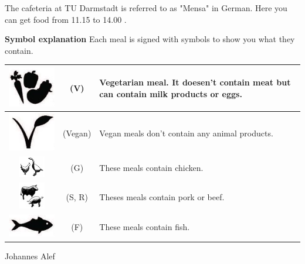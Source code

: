 {The cafeteria at TU Darmstadt is referred to as "Mensa" in German.
Here you can get food from 11.15 to 14.00 .
}{


\noindent\textbf{Symbol explanation}
Each meal is signed with symbols to show you what they contain.

\begin{tabular}{|c|c|p{3cm}|}
\hline
\rule{0pt}{1cm+1ex}\includegraphics[scale=0.5]{../grafik/artikel/vegetarian} & (V) & Vegetarian meal. It doesen't contain meat but can contain milk products or eggs.\\
 \hline
\rule{0pt}{1cm+1ex}\includegraphics[scale=0.5]{../grafik/artikel/vegan} & (Vegan) & Vegan meals don't contain any animal products.\\
 \hline
\rule{0pt}{1cm+1ex}\includegraphics[scale=0.5]{../grafik/artikel/chicken} & (G) & These meals contain chicken.\\
 \hline
\rule{0pt}{1cm+1ex}\includegraphics[scale=0.5]{../grafik/artikel/porkandbeef} & (S, R) & Theses meals contain pork or beef.\\
 \hline
\rule{0pt}{1cm+1ex}\includegraphics[scale=0.5]{../grafik/artikel/fish} & (F) & These meals contain fish.\\
 \hline
\end{tabular}


}{Johannes Alef}